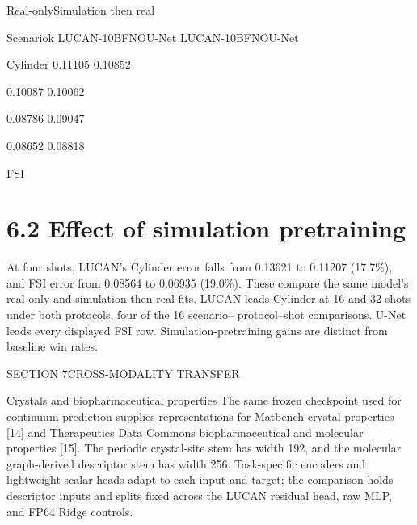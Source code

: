 \documentclass[11pt]{article}
\begin{document}
\noindent Real-only\quad Simulation then real\par


\noindent Scenario\quad k LUCAN-10B\quad FNO\quad U-Net LUCAN-10B\quad FNO\quad U-Net\par


\noindent Cylinder 0.11105 0.10852\par


 0.10087 0.10062\par


 0.08786 0.09047\par


 0.08652 0.08818\par


\noindent FSI\par


\par


\par


\par



\section*{6.2 Effect of simulation pretraining}

At four shots, LUCAN’s Cylinder error falls from 0.13621 to 0.11207 (17.7\%), and FSI
error from 0.08564 to 0.06935 (19.0\%). These compare the same model’s real-only and
simulation-then-real fits.
LUCAN leads Cylinder at 16 and 32 shots under both protocols, four of the 16 scenario–
protocol–shot comparisons. U-Net leads every displayed FSI row. Simulation-pretraining
gains are distinct from baseline win rates.


\noindent SECTION 7\quad CROSS-MODALITY TRANSFER\par


Crystals and biopharmaceutical properties
The same frozen checkpoint used for continuum prediction supplies representations for
Matbench crystal properties [14] and Therapeutics Data Commons biopharmaceutical and
molecular properties [15]. The periodic crystal-site stem has width 192, and the molecular
graph-derived descriptor stem has width 256. Task-specific encoders and lightweight scalar
heads adapt to each input and target; the comparison holds descriptor inputs and splits
fixed across the LUCAN residual head, raw MLP, and FP64 Ridge controls.
\end{document}
